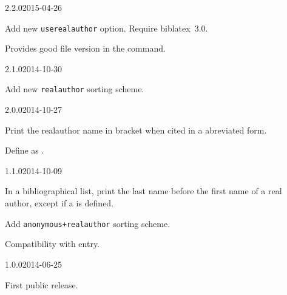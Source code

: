\documentclass{ltxdockit}[2011/03/25]
\newcommand{\biblatex}{biblatex\xspace}
\begin{document}
\begin{changelog}
  \begin{release}{2.2.0}{2015-04-26}
  \item Add new \verb|userealauthor| option. Require \biblatex~3.0. 
  \item Provides good file version in the  command.
  \end{release}

  \begin{release}{2.1.0}{2014-10-30}
  \item Add new \verb|realauthor| sorting scheme. 
  \end{release}


  \begin{release}{2.0.0}{2014-10-27}
  \item Print the realauthor name in bracket when cited in a abreviated form.
  \item Define  as . 
  \end{release}

\begin{release}{1.1.0}{2014-10-09}
\item In a bibliographical list, print the last name before the first name of a real author, except if a  is defined.
\item Add \verb|anonymous+realauthor| sorting scheme.   
\item Compatibility with  entry. 
\end{release}

\begin{release}{1.0.0}{2014-06-25}
\item First public release.
\end{release}
\end{changelog}
\end{document}
